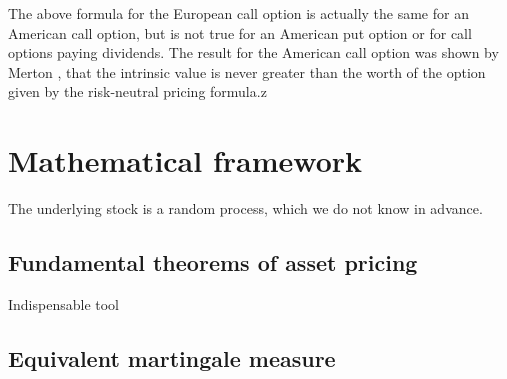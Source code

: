 The above formula for the European call option is actually the same for an American call option, but is not true for an American put option or for call options paying dividends. The result for the American call option was shown by Merton \parencite{Merton73}, that the intrinsic value is never greater than the worth of the option given by the risk-neutral pricing formula.z
\parencite{finKont}

\section{Mathematical framework}
The underlying stock is a random process, which we do not know in advance.

\subsection{Fundamental theorems of asset pricing}
Indispensable tool


\subsection{Equivalent martingale measure}

